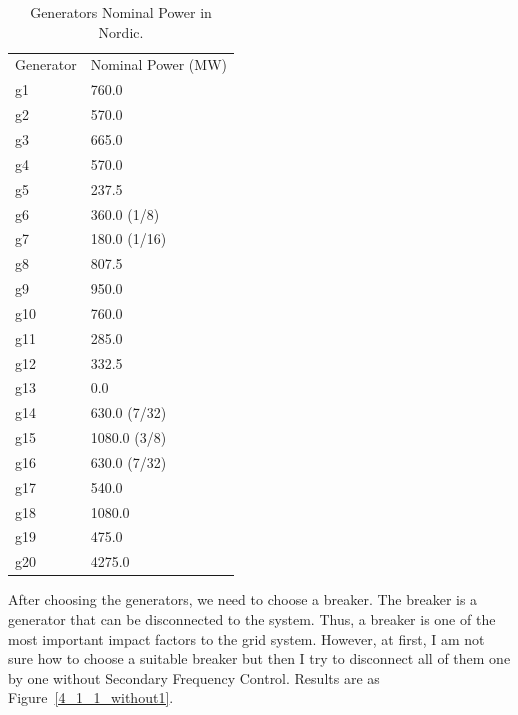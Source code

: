 \begin{table}[htbp]
\centering
\begin{tabular}{ll}
Generator & Nominal Power (MW) \\
g1        & 760.0              \\
g2        & 570.0              \\
g3        & 665.0              \\
g4        & 570.0              \\
g5        & 237.5              \\
g6        & 360.0 (1/8)        \\
g7        & 180.0 (1/16)       \\
g8        & 807.5              \\
g9        & 950.0              \\
g10       & 760.0              \\
g11       & 285.0              \\
g12       & 332.5              \\
g13       & 0.0                \\
g14       & 630.0 (7/32)       \\
g15       & 1080.0 (3/8)       \\
g16       & 630.0 (7/32)       \\
g17       & 540.0              \\
g18       & 1080.0             \\
g19       & 475.0              \\
g20       & 4275.0             

\end{tabular}
\caption{Generators Nominal Power in Nordic.}
\label{nominalPower}
\end{table}

After choosing the generators, we need to choose a breaker. The breaker is a generator that can be disconnected to the system. Thus, a breaker is one of the most important impact factors to the grid system. However, at first, I am not sure how to choose a suitable breaker but then I try to disconnect all of them one by one without Secondary Frequency Control. Results are as Figure~\ref{4_1_1_without1}.\\

